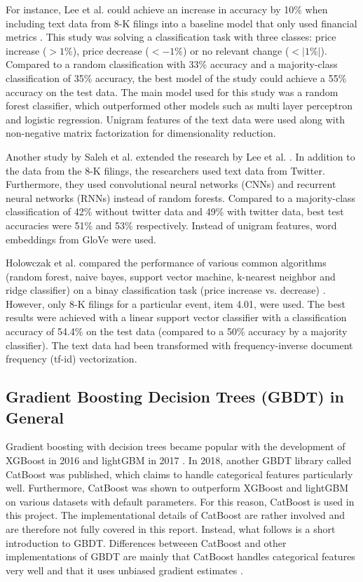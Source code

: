 \documentclass{article}
\begin{document}
	For instance, Lee et al. could achieve an increase in accuracy by 10\% when including text data from 8-K filings into a baseline model that only used financial metrics \cite{lee_importance_2014}. This study was solving a classification task with three classes: price increase ($> 1\%$), price decrease ($< -1\%$) or no relevant change ($< |1 \%|$). Compared to a random classification with 33\% accuracy and a majority-class classification of 35\% accuracy, the best model of the study could achieve a 55\% accuracy on the test data. The main model used for this study was a random forest classifier, which outperformed other models such as multi layer perceptron and logistic regression. Unigram features of the text data were used along with non-negative matrix factorization for dimensionality reduction.
	
	Another study by Saleh et al. extended the research by Lee et al. \cite{saleh_neural_nodate}. In addition to the data from the 8-K filings, the researchers used text data from Twitter. Furthermore, they used convolutional neural networks (CNNs) and recurrent neural networks (RNNs) instead of random forests. Compared to a majority-class classification of 42\% without twitter data and 49\% with twitter data, best test accuracies were 51\% and 53\% respectively. Instead of unigram features, word embeddings from GloVe were used.
	
	Holowczak et al. compared the performance of various common algorithms (random forest, naive bayes, support vector machine, k-nearest neighbor and ridge classifier) on a binay classification task (price increase vs. decrease) \cite{holowczak_testing_2019}. However, only 8-K filings for a particular event, item 4.01, were used. The best results were achieved with a linear support vector classifier with a classification accuracy of 54.4\% on the test data (compared to a 50\% accuracy by a majority classifier). The text data had been transformed with frequency-inverse document frequency (tf-id) vectorization.
	
	
	\subsection{Gradient Boosting Decision Trees (GBDT) in General}
	
	Gradient boosting with decision trees became popular with the development of XGBoost in 2016 \cite{chen_xgboost:_2016} and lightGBM in 2017 \cite{ke_lightgbm:_2017}. In 2018, another GBDT library called CatBoost was published, which claims to handle categorical features particularly well. Furthermore, CatBoost was shown to outperform XGBoost and lightGBM on various datasets with default parameters. For this reason, CatBoost is used in this project. The implementational details of CatBoost are rather involved and are therefore not fully covered in this report. Instead, what follows is a short introduction to GBDT. Differences betweeen CatBoost and other implementations of GBDT are mainly that CatBoost handles categorical features very well and that it uses unbiased gradient estimates \cite{dorogush_catboost:_2018}. 
	
\end{document}
